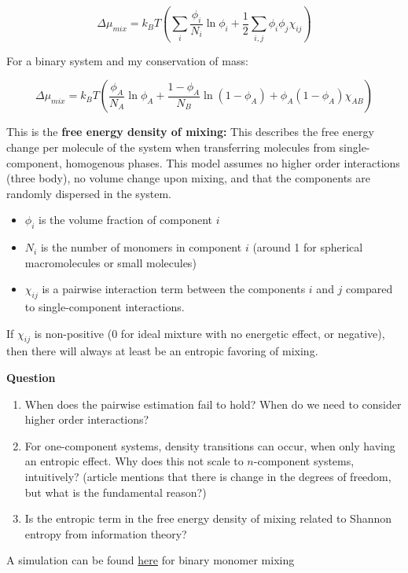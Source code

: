 \documentclass{article}
\begin{document}
\[\Delta\mu_{mix}=k_B T\left( \sum_i \frac{\phi_i}{N_i}\ln \phi_i + \frac{1}{2}\sum_{i,j} \phi_i \phi_j \chi_{ij}\right)\]

For a binary system and my conservation of mass:

\[\Delta\mu_{mix}=k_B T\left( \frac{\phi_A}{N_A}\ln \phi_A + \frac{1-\phi_A}{N_B}\ln (1-\phi_A) + \phi_A (1-\phi_A) \chi_{AB}\right)\]

This is the \textbf{free energy density of mixing:} This describes the free energy change per molecule of the system when transferring molecules from single-component, homogenous phases. This model assumes no higher order interactions (three body), no volume change upon mixing, and that the components are randomly dispersed in the system.

\begin{itemize}
    \item $\phi_i$ is the volume fraction of component $i$
    \item $N_i$ is the number of monomers in component $i$ (around 1 for spherical macromolecules or small molecules)
    \item $\chi_{ij}$ is a pairwise interaction term between the components $i$ and $j$ compared to single-component interactions.
\end{itemize}

If $\chi_{ij}$ is non-positive (0 for ideal mixture with no energetic effect, or negative), then there will always at least be an entropic favoring of mixing.

\textbf{Question}

\begin{enumerate}
    \item When does the pairwise estimation fail to hold? When do we need to consider higher order interactions?
    \item For one-component systems, density transitions can occur, when only having an entropic effect. Why does this not scale to $n$-component systems, intuitively? (article mentions that there is change in the degrees of freedom, but what is the fundamental reason?)
    \item Is the entropic term in the free energy density of mixing related to Shannon entropy from information theory?
\end{enumerate}

A simulation can be found \href{https://www.desmos.com/calculator/0n2oervaub}{here} for binary monomer mixing
\subsection{}
\end{document}
